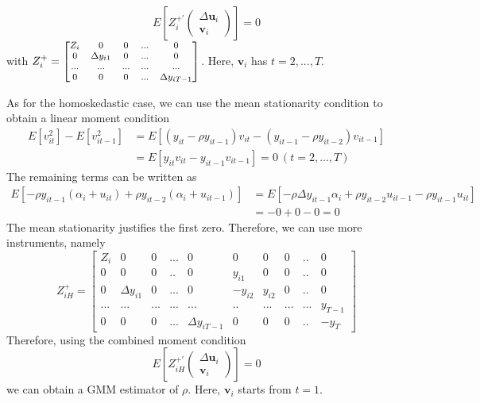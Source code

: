 \[
E\left[Z_i^{+'}\begin{pmatrix}\Delta \mathbf{u}_i \\ \mathbf{v}_i\end{pmatrix}\right]=0
\]
with $Z_i^+ = \footnotesize{\begin{bmatrix}Z_i & 0 & 0 & ... &0\\ 0 & \Delta y_{i1} & 0 & ... & 0 \\ ...&...&...&...&...\\ 0& 0& 0& ...& \Delta y_{iT-1}\end{bmatrix}}\normalsize$. Here, $\mathbf{v}_i$ has $t=2,...,T$. \par
As for the homoskedastic case, we can use the mean stationarity condition to obtain a linear moment condition
\begin{align*}
E[v_{it}^2]-E[v_{it-1}^2]&=E[(y_{it}-\rho y_{it-1})v_{it}-(y_{it-1}-\rho y_{it-2})v_{it-1}]\\
&=E[y_{it}v_{it}-y_{it-1}v_{it-1}]=0 \ (t=2,...,T)
\end{align*}
The remaining terms can be written as
\begin{align*}
E[-\rho y_{it-1} (\alpha_i + u_{it})+\rho y_{it-2}(\alpha_i+u_{it-1})]&=E[-\rho \Delta y_{it-1}\alpha_i +\rho y_{it-2}u_{it-1}-\rho y_{it-1}u_{it}]\\&=-0+0-0=0
\end{align*}
The mean stationarity justifies the first zero. Therefore, we can use more instruments, namely
\[
Z_{iH}^+ = \begin{bmatrix}Z_i & 0 & 0 & ... &0& 0&0&0&..&0\\ 0&0&0&..&0& y_{i1}& 0& 0& .. & 0 \\ 0 & \Delta y_{i1} & 0 & ... & 0& -y_{i2}& y_{i2}& 0& .. & 0 \\ ...&...&...&...&...&..&...&...&...&y_{T-1}\\ 0& 0& 0& ...& \Delta y_{iT-1}& 0 & 0 & 0 & .. & -y_T\end{bmatrix}
\]
Therefore, using the combined moment condition
\[
E\left[Z_{iH}^{+'} \begin{pmatrix} \Delta \mathbf{u}_i \\ \mathbf{v}_i\end{pmatrix}\right]=0
\]
we can obtain a GMM estimator of $\rho$. Here, $\mathbf{v}_i$ starts from $t=1$. 
